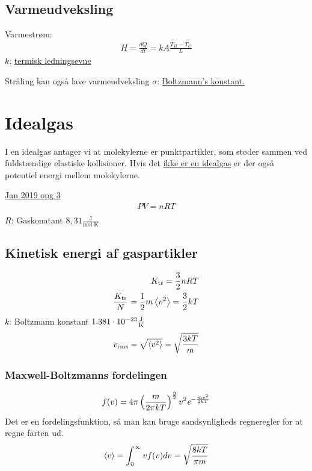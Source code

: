 \documentclass[a4paper,oneside,article]{memoir}
\begin{document}
\subsection{Varmeudveksling} \label{ssc:varmeudveksling}
Varmestrøm: 
\begin{align*}
    H = \frac{dQ}{dt} = kA\frac{T_H-T_C}{L}
\end{align*}
$k$: \hyperref[fig:termiskledningsevne]{termisk ledningsevne}

Stråling kan også lave varmeudveksling
$\sigma$: \hyperref[asc:konstanter]{Boltzmann's konstant.}

\section{Idealgas} \label{sc:idealgas}
I en idealgas antager vi at molekylerne er punktpartikler, som støder sammen ved fuldstændige elastiske kollisioner. Hvis det \hyperref[asc:Maj 2018 opg 6]{ikke er en idealgas} er der også potentiel energi mellem molekylerne. 

\hyperref[asc:Jan 2019 opg 3]{Jan 2019 opg 3}
\begin{align*}
    PV=nRT \\
\end{align*}
$R$: Gaskonatant $8,31 \frac{\text{J}}{\text{mol}\cdot\text{K}}$

\subsection{Kinetisk energi af gaspartikler} \label{ssc:idealgaskinetisk}
\begin{align*}
    K_\text{tr}=\frac{3}{2}nRT \\
    \frac{K_\text{tr}}{N} = \frac{1}{2}m\br[3]{v^2} = \frac{3}{2}kT
\end{align*}
$k$: Boltzmann konstant $1.381\cdot 10^{-23}\frac{\text{J}}{\text{K}}$
\begin{align*}
    v_\text{rms} = \sqrt{\br[3]{v^2}} = \sqrt{\frac{3kT}{m}}
\end{align*}

\subsubsection{Maxwell-Boltzmanns fordelingen} \label{sssc:maxwellfordeling}
\begin{align*}
    f(v) = 4\pi\br{\frac{m}{2\pi kT}}^{\frac{3}{2}}v^2\e{-\frac{mv^2}{2kT}}
\end{align*}
Det er en fordelingsfunktion, så man kan bruge sandsynligheds regneregler for at regne farten ud. 
\begin{align*}
    \br[3]{v} = \int_0^\infty vf(v)dv = \sqrt{\frac{8kT}{\pi m}}
\end{align*}
\end{document}
